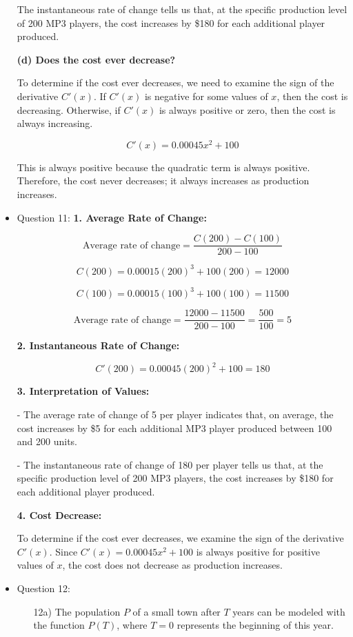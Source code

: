 \documentclass{article}
\begin{document}
\begin{itemize}
The instantaneous rate of change tells us that, at the specific production level of 200 MP3 players, the cost increases by \$180 for each additional player produced.

\textbf{(d) Does the cost ever decrease?}

To determine if the cost ever decreases, we need to examine the sign of the derivative \( C'(x) \). If \( C'(x) \) is negative for some values of \( x \), then the cost is decreasing. Otherwise, if \( C'(x) \) is always positive or zero, then the cost is always increasing.

\[ C'(x) = 0.00045x^2 + 100 \]

This is always positive because the quadratic term is always positive. Therefore, the cost never decreases; it always increases as production increases.

\item Question 11:
\textbf{1. Average Rate of Change:}

\[ \text{Average rate of change} = \frac{C(200) - C(100)}{200 - 100} \]

\[ C(200) = 0.00015(200)^3 + 100(200) = 12000 \]

\[ C(100) = 0.00015(100)^3 + 100(100) = 11500 \]

\[ \text{Average rate of change} = \frac{12000 - 11500}{200 - 100} = \frac{500}{100} = 5 \]

\textbf{2. Instantaneous Rate of Change:}

\[ C'(200) = 0.00045(200)^2 + 100 = 180 \]

\textbf{3. Interpretation of Values:}

- The average rate of change of 5 per player indicates that, on average, the cost increases by \$5 for each additional MP3 player produced between 100 and 200 units.

- The instantaneous rate of change of 180 per player tells us that, at the specific production level of 200 MP3 players, the cost increases by \$180 for each additional player produced.

\textbf{4. Cost Decrease:}

To determine if the cost ever decreases, we examine the sign of the derivative \(C'(x)\). Since \(C'(x) = 0.00045x^2 + 100\) is always positive for positive values of \(x\), the cost does not decrease as production increases.

\item Question 12:
\begin{enumerate}
    \item[12a)] 
The population \( P \) of a small town after \( T \) years can be modeled with the function \( P(T) \), where \( T = 0 \) represents the beginning of this year. 


\end{enumerate}
\end{itemize}
\end{document}
